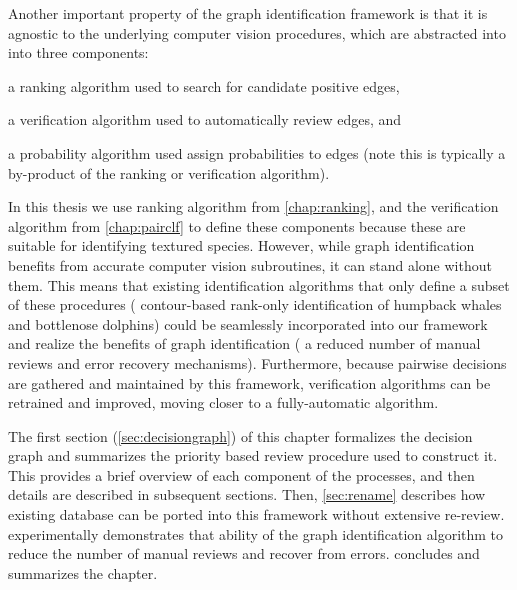Another important property of the graph identification framework is that it is agnostic to the underlying computer
vision procedures, which are abstracted into into three components:
\begin{enumin}
\item a ranking algorithm used to search for candidate positive edges, %
\item a verification algorithm used to automatically review edges, and %
\item a probability algorithm used assign probabilities to edges (note this is typically a by-product of the
ranking or verification algorithm).
\end{enumin}
In this thesis we use ranking algorithm from \cref{chap:ranking}, and the verification algorithm from
\cref{chap:pairclf} to define these components because these are suitable for identifying textured species.
However, while graph identification benefits from accurate computer vision subroutines, it can stand alone without
them.  This means that existing identification algorithms that only define a subset of these procedures (\eg{}
contour-based rank-only identification of humpback whales and bottlenose dolphins) could be seamlessly incorporated
into our framework and realize the benefits of graph identification (\eg{} a reduced number of manual reviews and
error recovery mechanisms).  Furthermore, because pairwise decisions are gathered and maintained by this framework,
verification algorithms can be retrained and improved, moving closer to a fully-automatic algorithm.


The first section (\cref{sec:decisiongraph}) of this chapter formalizes the
  decision graph and summarizes the priority based review procedure used to
  construct it.
This provides a brief overview of each component of the processes, and then
  details are described in subsequent sections.
Then, \cref{sec:rename} describes how existing database can be ported into
  this framework without extensive re-review.
 experimentally demonstrates that ability of the graph
  identification algorithm to reduce the number of manual reviews and recover
  from errors.
 concludes and summarizes the chapter.



